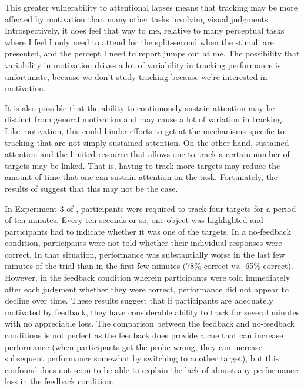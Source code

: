\documentclass[
]{book}
\begin{document}
This greater vulnerability to attentional lapses means that tracking may be more affected by motivation than many other tasks involving visual judgments. Introspectively, it does feel that way to me, relative to many perceptual tasks where I feel I only need to attend for the split-second when the stimuli are presented, and the percept I need to report jumps out at me. The possibility that variability in motivation drives a lot of variability in tracking performance is unfortunate, because we don't study tracking because we're interested in motivation.

It is also possible that the ability to continuously sustain attention may be distinct from general motivation and may cause a lot of variation in tracking. Like motivation, this could hinder efforts to get at the mechanisms specific to tracking that are not simply sustained attention. On the other hand, sustained attention and the limited resource that allows one to track a certain number of targets may be linked. That is, having to track more targets may reduce the amount of time that one can sustain attention on the task. Fortunately, the results of \citet{wolfeMultipleObjectJuggling2007} suggest that this may not be the case.

In Experiment 3 of \citet{wolfeMultipleObjectJuggling2007}, participants were required to track four targets for a period of ten minutes. Every ten seconds or so, one object was highlighted and participants had to indicate whether it was one of the targets. In a no-feedback condition, participants were not told whether their individual responses were correct. In that situation, performance was substantially worse in the last few minutes of the trial than in the first few minutes (78\% correct vs.~65\% correct). However, in the feedback condition wherein participants were told immediately after each judgment whether they were correct, performance did not appear to decline over time. These results suggest that if participants are adequately motivated by feedback, they have considerable ability to track for several minutes with no appreciable loss. The comparison between the feedback and no-feedback conditions is not perfect as the feedback does provide a cue that can increase performance (when participants get the probe wrong, they can increase subsequent performance somewhat by switching to another target), but this confound does not seem to be able to explain the lack of almost any performance loss in the feedback condition.
\end{document}
